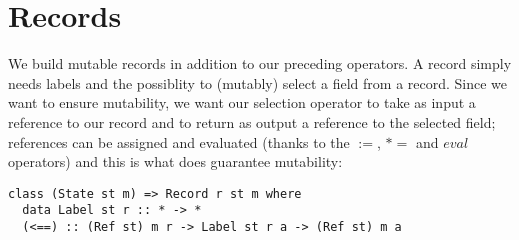 \section{Records}
We build mutable records in addition to our preceding operators. A record simply needs labels and the possiblity to (mutably) select a
field from a record. Since we want to ensure mutability, we want our selection operator to take as input a reference to our record and
to return as output a reference to the selected field; references can be assigned and evaluated (thanks to the $:=$, $*=$ and $eval$
operators) and this is what does guarantee mutability:

\begin{lstlisting}
class (State st m) => Record r st m where
  data Label st r :: * -> *
  (<==) :: (Ref st) m r -> Label st r a -> (Ref st) m a\end{lstlisting}
